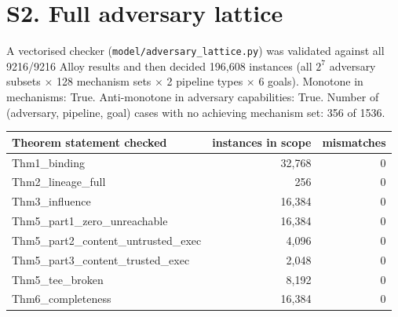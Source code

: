 \documentclass[10pt,a4paper]{article}
\begin{document}
\section{S2. Full adversary lattice}
A vectorised checker (\texttt{model/adversary\_lattice.py}) was validated against all 9216/9216 Alloy results and then decided 196,608 instances (all $2^7$ adversary subsets $\times$ 128 mechanism sets $\times$ 2 pipeline types $\times$ 6 goals).
Monotone in mechanisms: True. Anti-monotone in adversary capabilities: True. Number of (adversary, pipeline, goal) cases with no achieving mechanism set: 356 of 1536.
\par\medskip\begin{tabular}{lrr}\toprule Theorem statement checked & instances in scope & mismatches\\\midrule
Thm1\_binding & 32,768 & 0\\
Thm2\_lineage\_full & 256 & 0\\
Thm3\_influence & 16,384 & 0\\
Thm5\_part1\_zero\_unreachable & 16,384 & 0\\
Thm5\_part2\_content\_untrusted\_exec & 4,096 & 0\\
Thm5\_part3\_content\_trusted\_exec & 2,048 & 0\\
Thm5\_tee\_broken & 8,192 & 0\\
Thm6\_completeness & 16,384 & 0\\
\bottomrule\end{tabular}
\end{document}
